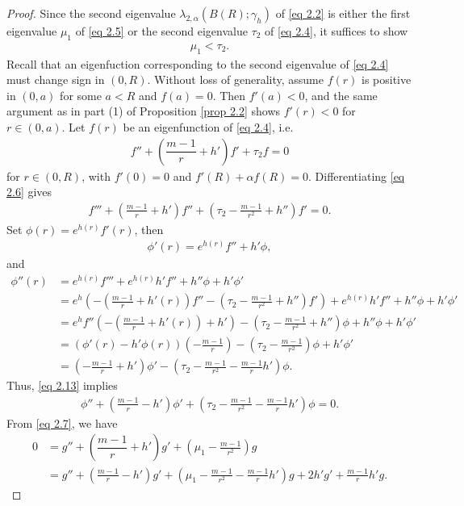 \documentclass[10pt,a4paper]{amsart}
\def\a{\alpha}
\def\l{\lambda}
\begin{document}
\begin{proof}
  Since the second eigenvalue $\l_{2, \a}(B(R);\gamma_h)$ of \eqref{eq 2.2} is  either the first eigenvalue $\mu_1$ of \eqref{eq 2.5}
 or the second eigenvalue $\tau_2$ of \eqref{eq 2.4},  it suffices to show
\begin{align*}
    \mu_1<\tau_2.
\end{align*}
Recall that an eigenfuction corresponding to the second eigenvalue of \eqref{eq 2.4} must change sign in $(0,R)$. Without loss of generality, assume $f(r)$ is positive in $(0, a)$ for some $a<R$ and $f(a)=0$. Then  $f'(a)<0$, and the same argument as in part (1) of Proposition \ref{prop 2.2} shows $f'(r)<0$ for $r\in(0, a)$.
Let  $f(r)$ be an eigenfunction of \eqref{eq 2.4}, i.e.
\begin{align}\label{eq 2.6}
 f'' + \left( \dfrac{m-1}{r} + h' \right)f' + \tau_2 f = 0  
\end{align}
for $r\in (0, R)$, with $f'(0)=0$ and $f'(R)+\a f(R)=0$.
Differentiating  \eqref{eq 2.6} gives
\begin{align}\label{eq 2.13}
    f'''+(\frac{m-1}{r}+h')f''+(\tau_{2}-\frac{m-1}{r^{2}}+h'')f'=0.
\end{align}
Set $\phi(r)=e^{h(r)}f'(r)$,  then 
\begin{align*}
    \phi'(r)=e^{h(r)}f''+h'\phi, 
\end{align*}
and
\begin{align*}
    \phi''(r)&=e^{h(r)}f'''+e^{h(r)}h'f''+h''\phi+h'\phi'\\
    &=e^{h}(-(\frac{m-1}{r}+h'(r))f''-(\tau_2-\frac{m-1}{r^{2}}+h'')f')+e^{h(r)}h'f''+h''\phi+h'\phi'\\
    &=e^{h}f''(-(\frac{m-1}{r}+h'(r))+h')-(\tau_{2}-\frac{m-1}{r^{2}}+h'')\phi+h''\phi+h'\phi'\\
    &=(\phi'(r)-h'\phi(r))(-\frac{m-1}{r})-(\tau_{2}-\frac{m-1}{r^{2}})\phi+h'\phi'\\
&=(-\frac{m-1}{r}+h')\phi'-(\tau_{2}-\frac{m-1}{r^{2}}-\frac{m-1}{r}h')\phi.
\end{align*}
Thus, \eqref{eq 2.13} implies
\begin{align}\label{eq 2.14}
    \phi''+(\frac{m-1}{r}-h')\phi'+(\tau_{2}-\frac{m-1}{r^{2}}-\frac{m-1}{r}h')\phi=0.
\end{align}
From  \eqref{eq 2.7}, we have
\begin{align*}
    0&=g'' + \left( \dfrac{m-1}{r} + h' \right) g'+ (\mu_{1}-\frac{m-1}{r^{2}}) g\\
    &=g''+(\frac{m-1}{r}-h')g'+(\mu_{1}-\frac{m-1}{r^{2}}-\frac{m-1}{r}h') g+2h'g'+\frac{m-1}{r}h'g.

\end{align*}
\end{proof}
\end{document}
